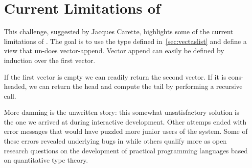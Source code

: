 \section{Current Limitations of \idris{}}\label{appendix:limitations}

This challenge, suggested by Jacques Carette, highlights some of the current
limitations of \idris{}.
%
The goal is to use the  type defined in~\cref{sec:vectaslist}
and define a view that un-does vector-append.
%
Vector append can easily be defined by induction over the first vector.


If the first vector is empty we can readily return the second vector.
%
If it is cons-headed, we can return the head and compute the tail by performing
a recursive call.





More damning is the unwritten story: this somewhat unsatisfactory solution is
the one we arrived at during interactive development.
%
Other attemps ended with error messages that would have puzzled more junior users
of the system.
%
Some of these errors revealed underlying bugs in \idris{} while others qualify
more as open research questions on the development of practical programming
languages based on quantitative type theory.
